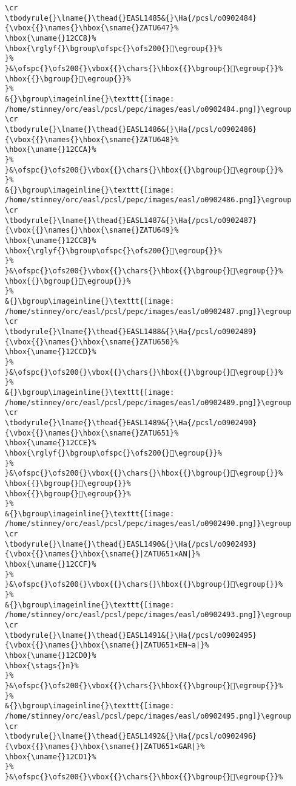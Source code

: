 \begin{verbatim}
\cr
\tbodyrule{}\lname{}\thead{}EASL1485&{}\Ha{/pcsl/o0902484}{\vbox{{}\names{}\hbox{\sname{}ZATU647}%
\hbox{\uname{}12CC8}%
\hbox{\rglyf{}\bgroup\ofspc{}\ofs200{}𒳈\egroup{}}%
}%
}&\ofspc{}\ofs200{}\vbox{{}\chars{}\hbox{{}\bgroup{}𒳈\egroup{}}%
\hbox{{}\bgroup{}𒳉\egroup{}}%
}%
&{}\bgroup\imageinline{}\texttt{[image: /home/stinney/orc/easl/pcsl/pepc/images/easl/o0902484.png]}\egroup
\cr
\tbodyrule{}\lname{}\thead{}EASL1486&{}\Ha{/pcsl/o0902486}{\vbox{{}\names{}\hbox{\sname{}ZATU648}%
\hbox{\uname{}12CCA}%
}%
}&\ofspc{}\ofs200{}\vbox{{}\chars{}\hbox{{}\bgroup{}𒳊\egroup{}}%
}%
&{}\bgroup\imageinline{}\texttt{[image: /home/stinney/orc/easl/pcsl/pepc/images/easl/o0902486.png]}\egroup
\cr
\tbodyrule{}\lname{}\thead{}EASL1487&{}\Ha{/pcsl/o0902487}{\vbox{{}\names{}\hbox{\sname{}ZATU649}%
\hbox{\uname{}12CCB}%
\hbox{\rglyf{}\bgroup\ofspc{}\ofs200{}𒳋\egroup{}}%
}%
}&\ofspc{}\ofs200{}\vbox{{}\chars{}\hbox{{}\bgroup{}𒳋\egroup{}}%
\hbox{{}\bgroup{}𒳌\egroup{}}%
}%
&{}\bgroup\imageinline{}\texttt{[image: /home/stinney/orc/easl/pcsl/pepc/images/easl/o0902487.png]}\egroup
\cr
\tbodyrule{}\lname{}\thead{}EASL1488&{}\Ha{/pcsl/o0902489}{\vbox{{}\names{}\hbox{\sname{}ZATU650}%
\hbox{\uname{}12CCD}%
}%
}&\ofspc{}\ofs200{}\vbox{{}\chars{}\hbox{{}\bgroup{}𒳍\egroup{}}%
}%
&{}\bgroup\imageinline{}\texttt{[image: /home/stinney/orc/easl/pcsl/pepc/images/easl/o0902489.png]}\egroup
\cr
\tbodyrule{}\lname{}\thead{}EASL1489&{}\Ha{/pcsl/o0902490}{\vbox{{}\names{}\hbox{\sname{}ZATU651}%
\hbox{\uname{}12CCE}%
\hbox{\rglyf{}\bgroup\ofspc{}\ofs200{}𒳎\egroup{}}%
}%
}&\ofspc{}\ofs200{}\vbox{{}\chars{}\hbox{{}\bgroup{}𒳘\egroup{}}%
\hbox{{}\bgroup{}𒳗\egroup{}}%
\hbox{{}\bgroup{}𒳎\egroup{}}%
}%
&{}\bgroup\imageinline{}\texttt{[image: /home/stinney/orc/easl/pcsl/pepc/images/easl/o0902490.png]}\egroup
\cr
\tbodyrule{}\lname{}\thead{}EASL1490&{}\Ha{/pcsl/o0902493}{\vbox{{}\names{}\hbox{\sname{}|ZATU651×AN|}%
\hbox{\uname{}12CCF}%
}%
}&\ofspc{}\ofs200{}\vbox{{}\chars{}\hbox{{}\bgroup{}𒳏\egroup{}}%
}%
&{}\bgroup\imageinline{}\texttt{[image: /home/stinney/orc/easl/pcsl/pepc/images/easl/o0902493.png]}\egroup
\cr
\tbodyrule{}\lname{}\thead{}EASL1491&{}\Ha{/pcsl/o0902495}{\vbox{{}\names{}\hbox{\sname{}|ZATU651×EN∼a|}%
\hbox{\uname{}12CD0}%
\hbox{\stags{}n}%
}%
}&\ofspc{}\ofs200{}\vbox{{}\chars{}\hbox{{}\bgroup{}𒳐\egroup{}}%
}%
&{}\bgroup\imageinline{}\texttt{[image: /home/stinney/orc/easl/pcsl/pepc/images/easl/o0902495.png]}\egroup
\cr
\tbodyrule{}\lname{}\thead{}EASL1492&{}\Ha{/pcsl/o0902496}{\vbox{{}\names{}\hbox{\sname{}|ZATU651×GAR|}%
\hbox{\uname{}12CD1}%
}%
}&\ofspc{}\ofs200{}\vbox{{}\chars{}\hbox{{}\bgroup{}𒳑\egroup{}}%

\end{verbatim}
